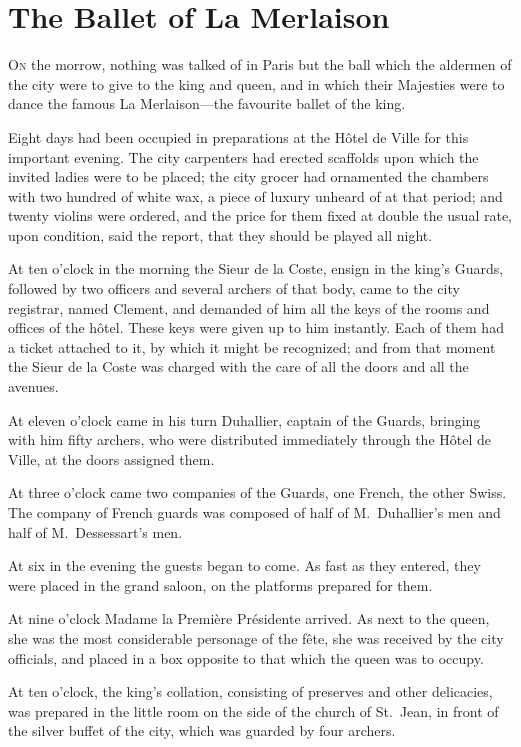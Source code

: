 
\chapter{The Ballet of La Merlaison}

\lettrine{O}{n} the morrow, nothing was talked of in Paris but the ball which the aldermen of the city were to give to the king and queen, and in which their Majesties were to dance the famous La Merlaison—the favourite ballet of the king. 

\zz
Eight days had been occupied in preparations at the Hôtel de Ville for this important evening. The city carpenters had erected scaffolds upon which the invited ladies were to be placed; the city grocer had ornamented the chambers with two hundred  of white wax, a piece of luxury unheard of at that period; and twenty violins were ordered, and the price for them fixed at double the usual rate, upon condition, said the report, that they should be played all night. 

At ten o'clock in the morning the Sieur de la Coste, ensign in the king's Guards, followed by two officers and several archers of that body, came to the city registrar, named Clement, and demanded of him all the keys of the rooms and offices of the hôtel. These keys were given up to him instantly. Each of them had a ticket attached to it, by which it might be recognized; and from that moment the Sieur de la Coste was charged with the care of all the doors and all the avenues. 

At eleven o'clock came in his turn Duhallier, captain of the Guards, bringing with him fifty archers, who were distributed immediately through the Hôtel de Ville, at the doors assigned them. 

At three o'clock came two companies of the Guards, one French, the other Swiss. The company of French guards was composed of half of M.~Duhallier's men and half of M.~Dessessart's men. 

At six in the evening the guests began to come. As fast as they entered, they were placed in the grand saloon, on the platforms prepared for them. 

At nine o'clock Madame la Première Présidente arrived. As next to the queen, she was the most considerable personage of the fête, she was received by the city officials, and placed in a box opposite to that which the queen was to occupy. 

At ten o'clock, the king's collation, consisting of preserves and other delicacies, was prepared in the little room on the side of the church of St.~Jean, in front of the silver buffet of the city, which was guarded by four archers. 


